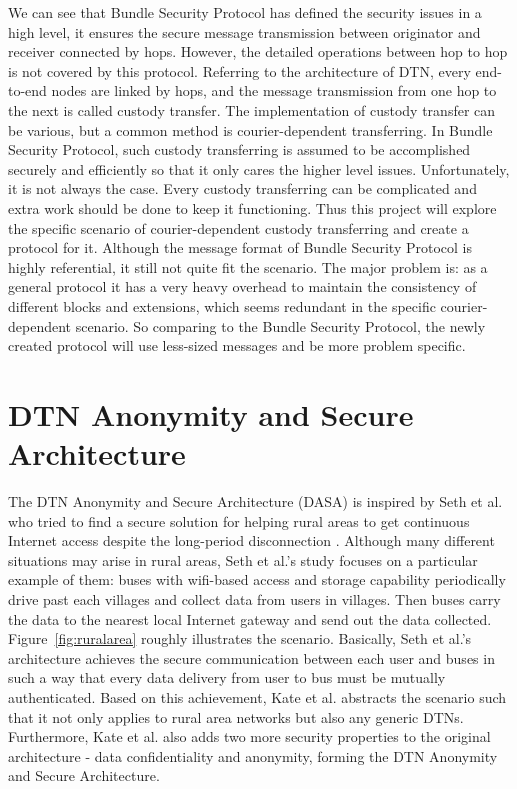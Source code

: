We can see that Bundle Security Protocol has defined the security issues in a high level, it ensures the secure message transmission between originator and receiver connected by hops. However, the detailed operations between hop to hop is not covered by this protocol. Referring to the architecture of DTN, every end-to-end nodes are linked by hops, and the message transmission from one hop to the next is called custody transfer. The implementation of custody transfer can be various, but a common method is courier-dependent transferring. In Bundle Security Protocol, such custody transferring is assumed to be accomplished securely and efficiently so that it only cares the higher level issues. Unfortunately, it is not always the case. Every custody transferring can be complicated and extra work should be done to keep it functioning. Thus this project will explore the specific scenario of courier-dependent custody transferring and create a protocol for it. Although the message format of Bundle Security Protocol is highly referential, it still not quite fit the scenario. The major problem is: as a general protocol it has a very heavy overhead to maintain the consistency of different blocks and extensions, which seems redundant in the specific courier-dependent scenario. So comparing to the Bundle Security Protocol, the newly created protocol will use less-sized messages and be more problem specific.

\section{DTN Anonymity and Secure Architecture \cite{Kate}}
The DTN Anonymity and Secure Architecture (DASA) is inspired by Seth et al. who tried to find a secure solution for helping rural areas to get continuous Internet access despite the long-period disconnection \cite{Seth}\cite{SethKeshav}. Although many different situations may arise in rural areas, Seth et al.'s study focuses on a particular example of them: buses with wifi-based access and storage capability periodically drive past each villages and collect data from users in villages. Then buses carry the data to the nearest local Internet gateway and send out the data collected. Figure~\ref{fig:ruralarea} roughly illustrates the scenario. Basically, Seth et al.'s architecture achieves the secure communication between each user and buses in such a way that every data delivery from user to bus must be mutually authenticated. Based on this achievement, Kate et al. abstracts the scenario such that it not only applies to rural area networks but also any generic DTNs. Furthermore, Kate et al. also adds two more security properties to the original architecture - data confidentiality and anonymity, forming the DTN Anonymity and Secure Architecture.

